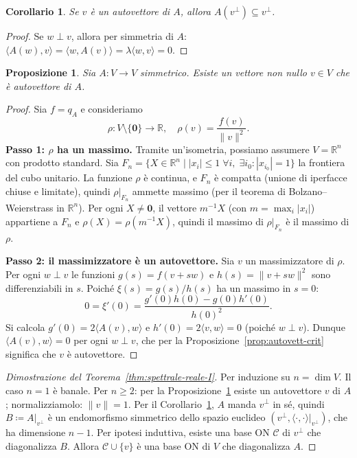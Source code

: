 \documentclass[11pt, a4paper]{book}
\theoremstyle{definition}
\theoremstyle{plain}
\newtheorem{proposizione}[definizione]{Proposizione}
\newtheorem{corollario}[definizione]{Corollario}
\theoremstyle{remark}
\newcommand{\R}{\mathbb{R}}
\begin{document}
\begin{corollario}
\label{cor:A-preserva-ort}
Se $v$ è un autovettore di $A$, allora $A(v^\perp) \subseteq v^\perp$.
\end{corollario}

\begin{proof}
Se $w \perp v$, allora per simmetria di $A$: $\langle A(w),v\rangle = \langle w,A(v)\rangle = \lambda\langle w,v\rangle = 0$.
\end{proof}

\begin{proposizione}
\label{prop:esistenza-autovett}
Sia $A \colon V \to V$ simmetrico. Esiste un vettore non nullo $v \in V$ che è autovettore di $A$.
\end{proposizione}

\begin{proof}
Sia $f = q_A$ e consideriamo
\[
  \rho \colon V \setminus \{\mathbf{0}\} \to \R, \quad \rho(v) = \frac{f(v)}{\|v\|^2}.
\]
\textbf{Passo 1: $\rho$ ha un massimo.} Tramite un'isometria, possiamo assumere $V = \R^n$ con prodotto standard. Sia $F_n = \{X \in \R^n \mid |x_i| \leq 1\;\forall i,\;\exists i_0 : |x_{i_0}|=1\}$ la frontiera del cubo unitario. La funzione $\rho$ è continua, e $F_n$ è compatta (unione di iperfacce chiuse e limitate), quindi $\rho|_{F_n}$ ammette massimo (per il teorema di Bolzano--Weierstrass in $\R^n$). Per ogni $X \neq \mathbf{0}$, il vettore $m^{-1}X$ (con $m = \max_i|x_i|$) appartiene a $F_n$ e $\rho(X) = \rho(m^{-1}X)$, quindi il massimo di $\rho|_{F_n}$ è il massimo di $\rho$.

\textbf{Passo 2: il massimizzatore è un autovettore.} Sia $v$ un massimizzatore di $\rho$. Per ogni $w \perp v$ le funzioni $g(s) = f(v+sw)$ e $h(s) = \|v+sw\|^2$ sono differenziabili in $s$. Poiché $\xi(s) = g(s)/h(s)$ ha un massimo in $s=0$:
\[
  0 = \xi'(0) = \frac{g'(0)h(0) - g(0)h'(0)}{h(0)^2}.
\]
Si calcola $g'(0) = 2\langle A(v),w\rangle$ e $h'(0) = 2\langle v,w\rangle = 0$ (poiché $w \perp v$). Dunque $\langle A(v),w\rangle = 0$ per ogni $w \perp v$, che per la Proposizione~\ref{prop:autovett-crit} significa che $v$ è autovettore.
\end{proof}

\begin{proof}[Dimostrazione del Teorema~\ref{thm:spettrale-reale-I}]
Per induzione su $n = \dim V$. Il caso $n = 1$ è banale. Per $n \geq 2$: per la Proposizione~\ref{prop:esistenza-autovett} esiste un autovettore $v$ di $A$; normalizziamolo: $\|v\| = 1$. Per il Corollario~\ref{cor:A-preserva-ort}, $A$ manda $v^\perp$ in sé, quindi $B \coloneqq A|_{v^\perp}$ è un endomorfismo simmetrico dello spazio euclideo $(v^\perp, \langle\cdot,\cdot\rangle|_{v^\perp})$, che ha dimensione $n-1$. Per ipotesi induttiva, esiste una base ON $\mathcal{C}$ di $v^\perp$ che diagonalizza $B$. Allora $\mathcal{C} \cup \{v\}$ è una base ON di $V$ che diagonalizza $A$.
\end{proof}
\end{document}
